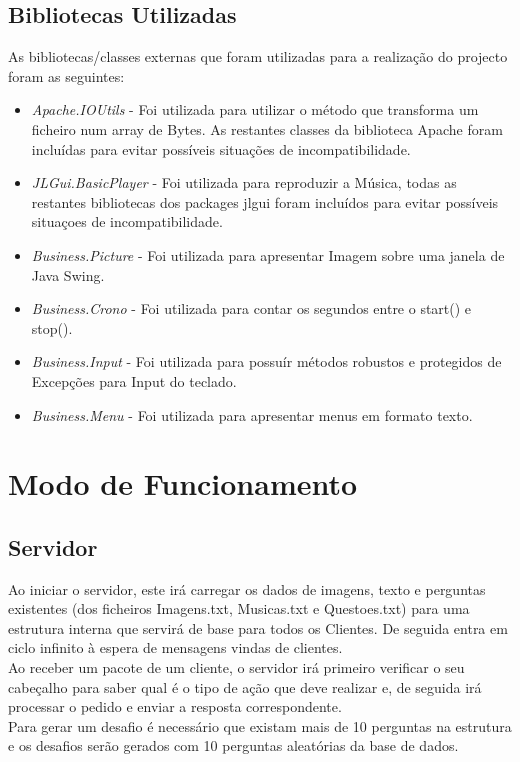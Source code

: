 \documentclass{llncs}
\begin{document}
\subsection{Bibliotecas Utilizadas}
As bibliotecas/classes externas que foram utilizadas para a realização do projecto foram as seguintes:
\begin{itemize}
\item \emph{Apache.IOUtils} - Foi utilizada para utilizar o método que transforma um ficheiro num array de Bytes. As restantes classes da biblioteca Apache foram incluídas para evitar possíveis situações de incompatibilidade.
\item \emph{JLGui.BasicPlayer} - Foi utilizada para reproduzir a Música, todas as restantes bibliotecas dos packages jlgui foram incluídos para evitar possíveis situaçoes de incompatibilidade.
\item \emph{Business.Picture} - Foi utilizada para apresentar Imagem sobre uma janela de Java Swing.
\item \emph{Business.Crono} - Foi utilizada para contar os segundos entre o start() e stop().
\item \emph{Business.Input} - Foi utilizada para possuír métodos robustos e protegidos de Excepções para Input do teclado.
\item \emph{Business.Menu} - Foi utilizada para apresentar menus em formato texto.
\end{itemize}
\section{Modo de Funcionamento}
\subsection{Servidor}
Ao iniciar o servidor, este irá carregar os dados de imagens, texto e perguntas existentes (dos ficheiros Imagens.txt, Musicas.txt e Questoes.txt) para uma estrutura interna que servirá de base para todos os Clientes. De seguida entra em ciclo infinito à espera de mensagens vindas de clientes.\\
Ao receber um pacote de um cliente, o servidor irá primeiro verificar o seu cabeçalho para saber qual é o tipo de ação que deve realizar e, de seguida irá processar o pedido e enviar a resposta correspondente.\\
Para gerar um desafio é necessário que existam mais de 10 perguntas na estrutura e os desafios serão gerados com 10 perguntas aleatórias da base de dados.
\end{document}

